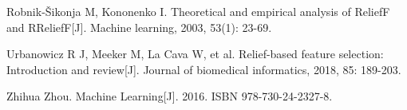 \documentclass{article}
\begin{document}
\begin{thebibliography}{1}

Robnik-Šikonja M, Kononenko I. Theoretical and empirical analysis of ReliefF and RReliefF[J]. Machine learning, 2003, 53(1): 23-69.

Urbanowicz R J, Meeker M, La Cava W, et al. Relief-based feature selection: Introduction and review[J]. Journal of biomedical informatics, 2018, 85: 189-203.

Zhihua Zhou. Machine Learning[J]. 2016. ISBN 978-730-24-2327-8.

\end{thebibliography}
\end{document}
